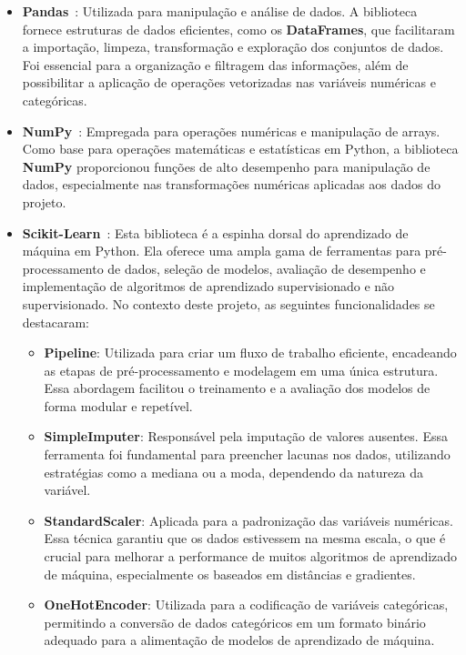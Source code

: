 \begin{itemize}
    \item \textbf{Pandas}~\cite{mckinney2010data}: Utilizada para manipulação e análise de dados. A biblioteca fornece estruturas de dados eficientes, como os \textbf{DataFrames}, que facilitaram a importação, limpeza, transformação e exploração dos conjuntos de dados. Foi essencial para a organização e filtragem das informações, além de possibilitar a aplicação de operações vetorizadas nas variáveis numéricas e categóricas.

    \item \textbf{NumPy}~\cite{harris2020numpy}: Empregada para operações numéricas e manipulação de arrays. Como base para operações matemáticas e estatísticas em Python, a biblioteca \textbf{NumPy} proporcionou funções de alto desempenho para manipulação de dados, especialmente nas transformações numéricas aplicadas aos dados do projeto.

    \item \textbf{Scikit-Learn}~\cite{pedregosa2011scikit}: Esta biblioteca é a espinha dorsal do aprendizado de máquina em Python. Ela oferece uma ampla gama de ferramentas para pré-processamento de dados, seleção de modelos, avaliação de desempenho e implementação de algoritmos de aprendizado supervisionado e não supervisionado. No contexto deste projeto, as seguintes funcionalidades se destacaram:
    \begin{itemize}
        \item \textbf{Pipeline}: Utilizada para criar um fluxo de trabalho eficiente, encadeando as etapas de pré-processamento e modelagem em uma única estrutura. Essa abordagem facilitou o treinamento e a avaliação dos modelos de forma modular e repetível.

        \item \textbf{SimpleImputer}: Responsável pela imputação de valores ausentes. Essa ferramenta foi fundamental para preencher lacunas nos dados, utilizando estratégias como a mediana ou a moda, dependendo da natureza da variável.

        \item \textbf{StandardScaler}: Aplicada para a padronização das variáveis numéricas. Essa técnica garantiu que os dados estivessem na mesma escala, o que é crucial para melhorar a performance de muitos algoritmos de aprendizado de máquina, especialmente os baseados em distâncias e gradientes.

        \item \textbf{OneHotEncoder}: Utilizada para a codificação de variáveis categóricas, permitindo a conversão de dados categóricos em um formato binário adequado para a alimentação de modelos de aprendizado de máquina.


\end{itemize}
\end{itemize}

